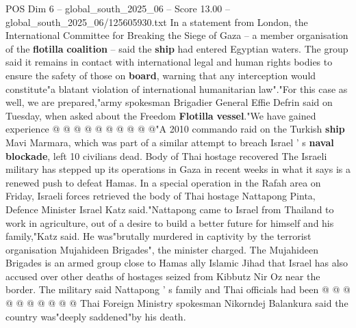 \begin{textsample}{POS Dim 6 – global\_south\_2025\_06 – Score 13.00 – global\_south\_2025\_06/125605930.txt}
In a statement from London, the International Committee for Breaking the Siege of Gaza -- a member organisation of the \textbf{flotilla} \textbf{coalition} -- said the \textbf{ship} had entered Egyptian waters.
The group said it remains in contact with international legal and human rights bodies to ensure the safety of those on \textbf{board}, warning that any interception would constitute"a blatant violation of international humanitarian law"."For this case as well, we are prepared,"army spokesman Brigadier General Effie Defrin said on Tuesday, when asked about the Freedom \textbf{Flotilla} \textbf{vessel}."We have gained experience @ @ @ @ @ @ @ @ @ @"A 2010 commando raid on the Turkish \textbf{ship} Mavi Marmara, which was part of a similar attempt to breach Israel ' s \textbf{naval} \textbf{blockade}, left 10 civilians dead.
Body of Thai hostage recovered The Israeli military has stepped up its operations in Gaza in recent weeks in what it says is a renewed push to defeat Hamas.
In a special operation in the Rafah area on Friday, Israeli forces retrieved the body of Thai hostage Nattapong Pinta, Defence Minister Israel Katz said."Nattapong came to Israel from Thailand to work in agriculture, out of a desire to build a better future for himself and his family,"Katz said.
He was"brutally murdered in captivity by the terrorist organisation Mujahideen Brigades", the minister charged.
The Mujahideen Brigades is an armed group close to Hamas ally Islamic Jihad that Israel has also accused over other deaths of hostages seized from Kibbutz Nir Oz near the border.
The military said Nattapong ' s family and Thai officials had been @ @ @ @ @ @ @ @ @ @ Thai Foreign Ministry spokesman Nikorndej Balankura said the country was"deeply saddened"by his death.

\end{textsample}
